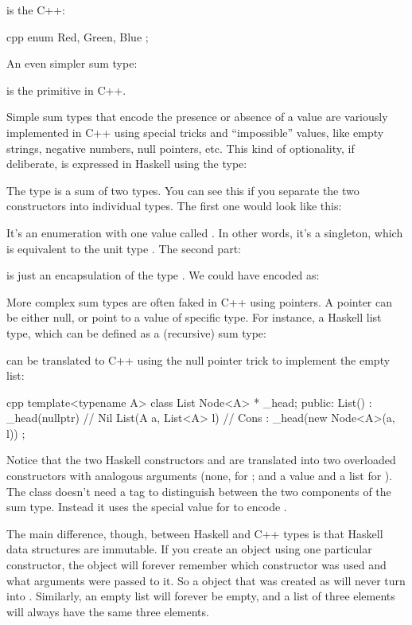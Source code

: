is the C++:

\begin{snip}{cpp}
enum { Red, Green, Blue };
\end{snip}
An even simpler sum type:

is the primitive  in C++.

Simple sum types that encode the presence or absence of a value are
variously implemented in C++ using special tricks and ``impossible''
values, like empty strings, negative numbers, null pointers, etc. This
kind of optionality, if deliberate, is expressed in Haskell using the
 type:

The  type is a sum of two types. You can see this if you
separate the two constructors into individual types. The first one would
look like this:

It's an enumeration with one value called . In other
words, it's a singleton, which is equivalent to the unit type
\code{()}. The second part:

is just an encapsulation of the type . We could have encoded
 as:

More complex sum types are often faked in C++ using pointers. A pointer
can be either null, or point to a value of specific type. For instance,
a Haskell list type, which can be defined as a (recursive) sum type:

can be translated to C++ using the null pointer trick to implement the
empty list:

\begin{snip}{cpp}
template<typename A>
class List {
    Node<A> * _head;
public:
    List() : _head(nullptr) {} // Nil
    List(A a, List<A> l)       // Cons
      : _head(new Node<A>(a, l))
    {}
};
\end{snip}
Notice that the two Haskell constructors  and 
are translated into two overloaded  constructors with
analogous arguments (none, for ; and a value and a list for
). The  class doesn't need a tag to
distinguish between the two components of the sum type. Instead it uses
the special  value for  to encode
.

The main difference, though, between Haskell and C++ types is that
Haskell data structures are immutable. If you create an object using one
particular constructor, the object will forever remember which
constructor was used and what arguments were passed to it. So a
 object that was created as  will
never turn into . Similarly, an empty list will forever
be empty, and a list of three elements will always have the same three
elements.

